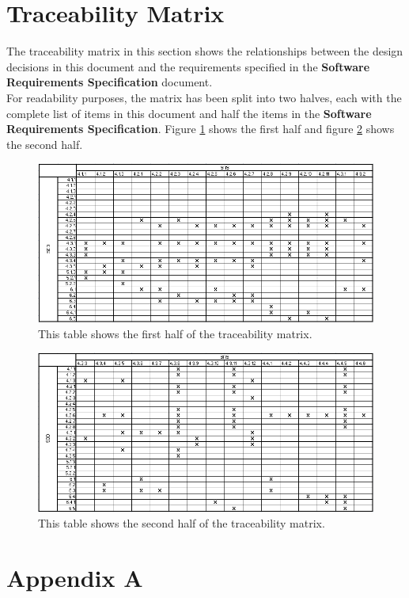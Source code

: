 \documentclass[11pt]{article}
\begin{document}
\section{Traceability Matrix}\label{section-trace-matrix}
The traceability matrix in this section shows the relationships between the design decisions in this document and the requirements specified in the \textbf{Software Requirements Specification} document.\\
For readability purposes, the matrix has been split into two halves, each with the complete list of items in this document and half the items in the \textbf{Software Requirements Specification}. Figure \ref{tbl-trace-1} shows the first half and figure \ref{tbl-trace-2} shows the second half.
\begin{figure}[H]
\centering
\includegraphics[width=5in]{./images/trace_matrix_1.png}
\caption[Traceability Matrix Part 1]{This table shows the first half of the traceability matrix.}
\label{tbl-trace-1}
\end{figure}
\begin{figure}[H]
\centering
\includegraphics[width=5in]{./images/trace_matrix_2.png}
\caption[Traceability Matrix Part 1]{This table shows the second half of the traceability matrix.}
\label{tbl-trace-2}
\end{figure}
\newpage
\section{Appendix A}
\end{document}
